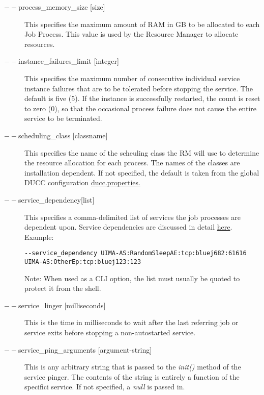 \begin{description}
      \item[$--$process\_memory\_size {[size]}] This specifies the maximum amount of RAM in GB to be
        allocated to each Job Process.  This value is used by the Resource Manager to allocate
        resources. 

      \item[$--$instance\_failures\_limit {[integer]}] 
        This specifies the maximum number of consecutive individual service instance failures that are to be 
        tolerated before stopping the service. The default is five (5). If the instance is successfully
        restarted, the count is reset to zero (0), so that the occasional process failure does not cause
        the entire service to be terminated.
        
      \item[$--$scheduling\_class {[classname]}] This specifies the name of the scheuling class the RM
        will use to determine the resource allocation for each process. The names of the classes are
        installation dependent. If not specified, the default is taken from the global DUCC
        configuration \hyperref[sec:ducc.properties]{ducc.properties.}

      \item[$--$service\_dependency{[list]}] This specifies a comma-delimited list of services the job
        processes are dependent upon. Service dependencies are discussed in detail
        \hyperref[sec:service.endpoints]{here}. Example:
\begin{verbatim}
--service_dependency UIMA-AS:RandomSleepAE:tcp:bluej682:61616 UIMA-AS:OtherEp:tcp:bluej123:123 
\end{verbatim}

        Note: When used as a CLI option, the list must usually be
        quoted to protect it from the shell.
          

      \item[$--$service\_linger {[milliseconds]}] This is the time in milliseconds to wait after the last
        referring job or service exits before stopping a non-autostarted service.

      \item[$--$service\_ping\_arguments {[argument-string]}] This is any arbitrary string
        that is passed to the {\em init()} method of the service pinger.  The contents of
        the string is entirely a function of the specifici service.  If not specified,
        a {\em null} is passed in.


\end{description}
